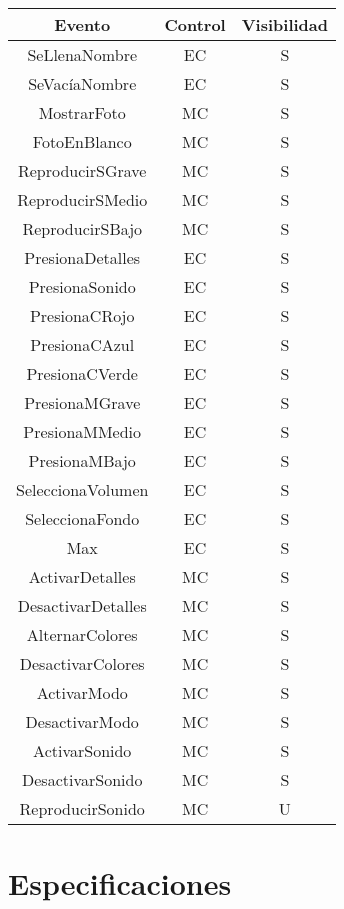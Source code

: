 \documentclass[11pt]{article}
\begin{document}
\begin{table}[h!]
\begin{center}
\begin{tabular}{|c|c|c|}
    \hline
    Evento & Control & Visibilidad \\ \hline
    SeLlenaNombre       & EC & S \\ \hline
    SeVacíaNombre       & EC & S \\ \hline
    MostrarFoto         & MC & S \\ \hline
    FotoEnBlanco        & MC & S \\ \hline
    ReproducirSGrave    & MC & S \\ \hline
    ReproducirSMedio    & MC & S \\ \hline
    ReproducirSBajo     & MC & S \\ \hline
    PresionaDetalles    & EC & S \\ \hline
    PresionaSonido      & EC & S \\ \hline
    PresionaCRojo       & EC & S \\ \hline
    PresionaCAzul       & EC & S \\ \hline
    PresionaCVerde      & EC & S \\ \hline
    PresionaMGrave      & EC & S \\ \hline
    PresionaMMedio      & EC & S \\ \hline
    PresionaMBajo       & EC & S \\ \hline
    SeleccionaVolumen   & EC & S \\ \hline
    SeleccionaFondo     & EC & S \\ \hline
    Max                 & EC & S \\ \hline
    ActivarDetalles     & MC & S \\ \hline
    DesactivarDetalles  & MC & S \\ \hline
    AlternarColores     & MC & S \\ \hline
    DesactivarColores   & MC & S \\ \hline
    ActivarModo         & MC & S \\ \hline
    DesactivarModo      & MC & S \\ \hline
    ActivarSonido       & MC & S \\ \hline
    DesactivarSonido    & MC & S \\ \hline
    ReproducirSonido    & MC & U \\ \hline
\end{tabular}
\end{center}
\end{table}

\section*{Especificaciones}
\end{document}
